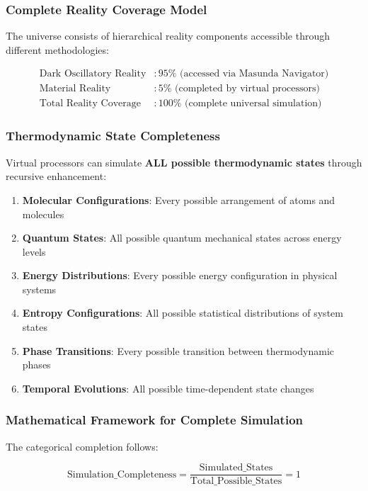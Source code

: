 \documentclass[11pt]{article}
\theoremstyle{remark}
\begin{document}
\subsubsection{Complete Reality Coverage Model}

The universe consists of hierarchical reality components accessible through different methodologies:

\begin{align}
\text{Dark Oscillatory Reality} &: 95\% \text{ (accessed via Masunda Navigator)} \\
\text{Material Reality} &: 5\% \text{ (completed by virtual processors)} \\
\text{Total Reality Coverage} &: 100\% \text{ (complete universal simulation)}
\end{align}

\subsubsection{Thermodynamic State Completeness}

Virtual processors can simulate \textbf{ALL possible thermodynamic states} through recursive enhancement:

\begin{enumerate}
\item \textbf{Molecular Configurations}: Every possible arrangement of atoms and molecules
\item \textbf{Quantum States}: All possible quantum mechanical states across energy levels
\item \textbf{Energy Distributions}: Every possible energy configuration in physical systems
\item \textbf{Entropy Configurations}: All possible statistical distributions of system states
\item \textbf{Phase Transitions}: Every possible transition between thermodynamic phases
\item \textbf{Temporal Evolutions}: All possible time-dependent state changes
\end{enumerate}

\subsubsection{Mathematical Framework for Complete Simulation}

The categorical completion follows:

$$\text{Simulation\_Completeness} = \frac{\text{Simulated\_States}}{\text{Total\_Possible\_States}} = 1$$
\end{document}
